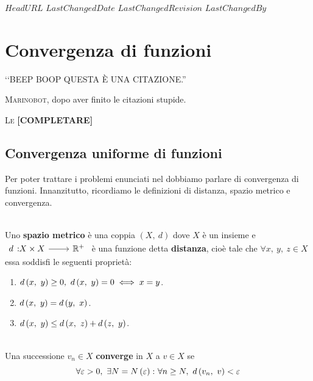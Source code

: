 \svnidlong
{$HeadURL$}
{$LastChangedDate$}
{$LastChangedRevision$}
{$LastChangedBy$}

\chapter{Convergenza di funzioni}

\begin{introduction}
	‘‘BEEP BOOP QUESTA È UNA CITAZIONE.''
	\begin{flushright}
		\textsc{Marinobot,} dopo aver finito le citazioni stupide.
	\end{flushright}
\end{introduction}
\lettrine[findent=1pt, nindent=0pt]{L}{e} \textbf{[COMPLETARE]} %
\section{Convergenza uniforme di funzioni}
Per poter trattare i problemi enunciati nel  dobbiamo parlare di convergenza di funzioni. Innanzitutto, ricordiamo le definizioni di distanza, spazio metrico e convergenza.
\begin{define}~{}\\
	Uno \textbf{spazio metrico} è una coppia $\left(X,\ d\right)$ dove $X$ è un insieme e $\funz{d}{X\times X}{\realset^+}$ è una funzione detta \textbf{distanza}, cioè tale che $\forall x,\ y,\ z\in X$ essa soddisfi le seguenti proprietà:
	\begin{enumerate}
		\item $\mvf{d}{x}{y}\geq 0,\ \mvf{d}{x}{y}=0\iff x=y$.
		\item $d\left(x,\ y\right)=d\left(y,\ x\right)$.
		\item $d\left(x,\ y\right)\leq d\left(x,\ z\right)+d\left(z,\ y\right)$.
	\end{enumerate}
\end{define}
\begin{define}~{}\\
	Una successione $v_n\in X$ \textbf{converge} in $X$ a $v\in X$ se
	\begin{equation}
		\forall \epsilon >0,\ \exists N=N\left(\epsilon\right)\colon \forall n\geq N,\ \mvf{d}{v_n}{v}<\epsilon
	\end{equation}
\end{define}

